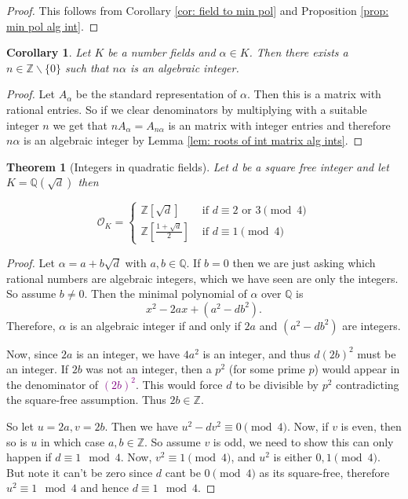 \documentclass[11pt,a4paper]{report}
\theoremstyle{plain}
\newtheorem{thm}[subsection]{Theorem}
\newtheorem{cor}[subsection]{Corollary}
\theoremstyle{definition}
\theoremstyle{definition}
\newcommand{\ZZ}{\mathbb{Z}}
\def\QQ{\mathbb{Q}}
\def \a{\alpha}
\def \OO {\mathcal{O}}
\begin{document}
	
	
	\begin{proof}
		This follows from Corollary \ref{cor: field to min pol} and Proposition \ref{prop: min pol alg int}.
	\end{proof}
	
	\begin{cor}
		Let $K$ be a number fields and $\a \in K$. Then there exists a $n \in \ZZ\backslash\{0\}$ such that $n \a$ is an algebraic integer.  
	\end{cor}
	
	\begin{proof}
		Let $A_\a$ be the standard representation of $\a$. Then this is a matrix with rational entries. So if we clear denominators by multiplying with a suitable integer $n$ we get that $n A_\a=A_{n\a}$ is an matrix with integer entries and therefore $n\a$ is an algebraic integer by Lemma \ref{lem: roots of int matrix alg ints}.
	\end{proof}
	
	
	
	\begin{thm}[Integers in quadratic fields]\label{thm: int quad field} Let $d$ be a square free integer and let $K=\QQ(\sqrt{d})$ then
		
		\[\OO_K= \begin{cases}
			\ZZ[\sqrt{d}] & \text{ if } d\equiv 2 \text{ or } 3 \pmod 4 \\
			\ZZ[\frac{1+\sqrt{d}}{2}] &  \text{ if } d\equiv 1 \pmod 4
		\end{cases}   \]
		
		
		
	\end{thm}
	
	\begin{proof}
		Let $\a=a+b\sqrt{d}$ with $a,b \in \QQ$. If $b=0$ then we are just asking which rational numbers are algebraic integers, which we have seen are only the integers. So assume $b \neq 0$. Then the minimal polynomial of $\a$ over $\QQ$ is \[x^2-2ax+ (a^2-db^2).\] Therefore, $\a$ is an algebraic integer if and only if $2a$ and  $(a^2-db^2)$ are integers.
		
		
		
		Now, since $2a$ is an integer, we have $4a^2$ is an integer, and thus $d(2b)^2$ must be an integer. If $2b$ was not an integer, then  a $p^2$ (for some prime $p$) would appear in the denominator of \textcolor{purple}{$(2b)^2$}. This would force $d$ to be divisible by $p^2$ contradicting the square-free assumption. Thus $2b \in \ZZ$.
		
		So let $u=2a,v=2b$. Then we have $u^2-dv^2 \equiv 0 \pmod 4$. Now, if $v$ is even, then so is $u$ in which case $a,b \in \ZZ$. So assume $v$ is odd, we need to show this can only happen if $d \equiv 1 \mod 4$. Now, $v^2 \equiv 1 \pmod 4$, and $u^2$ is either $0,1 \pmod 4$. But note it can't be zero since $d$ cant be $0 \pmod 4$ as its square-free, therefore $u^2 \equiv 1 \mod 4$ and hence $d \equiv 1 \mod 4$.	
	\end{proof}
	
\end{document}
